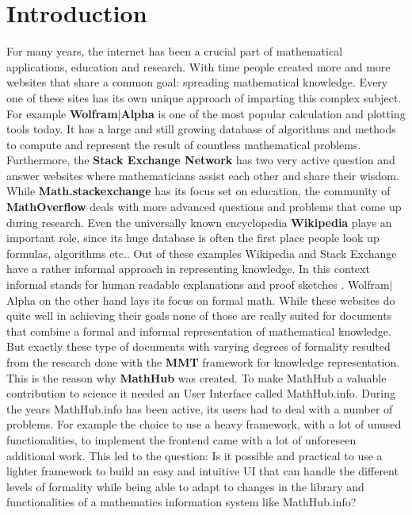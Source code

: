 \documentclass[11pt,a4paper]{article}
\begin{document}
\section{Introduction}
For many years, the internet has been a crucial part of mathematical applications, education and research.
With time people created more and more websites that share a common goal: spreading mathematical knowledge.
Every one of these sites has its own unique approach of imparting this complex subject.
For example \textbf{Wolfram$|$Alpha} \cite{wolfram} is one of the most popular calculation and plotting tools today.
It has a large and still growing database of algorithms and methods to compute and represent the result of countless mathematical problems.
Furthermore, the \textbf{Stack Exchange Network} \cite{stack} has two very active question and answer websites where mathematicians assist each other and share their wisdom.
While \textbf{Math.stackexchange} has its focus set on education, the community of \textbf{MathOverflow} deals with more advanced questions and problems that come up during research.
Even the universally known encyclopedia \textbf{Wikipedia} plays an important role, since its huge database is often the first place people look up formulas, algorithms etc..
\newline \newline
Out of these examples Wikipedia and Stack Exchange have a rather informal approach in representing knowledge.
In this context informal stands for human readable explanations and proof sketches \cite{flexiforms}.
Wolfram$|$Alpha on the other hand lays its focus on formal math.
While these websites do quite well in achieving their goals none of those are really suited for documents that combine a formal and informal representation of mathematical knowledge.
But exactly these type of documents with varying degrees of formality resulted from the research done with the \textbf{MMT} framework for knowledge representation.
This is the reason why \textbf{MathHub} \cite{MathHub} was created.
To make MathHub a valuable contribution to science it needed an User Interface called MathHub.info.
During the years MathHub.info has been active, its users had to deal with a number of problems.
For example the choice to use a heavy framework, with a lot of unused functionalities, to implement the frontend came with a lot of unforeseen additional work.
This led to the question: Is it possible and practical to use a lighter framework to build an easy and intuitive UI that can handle the different levels of formality while being able to adapt to changes in the library and functionalities of a mathematics information system like MathHub.info?
\end{document}
